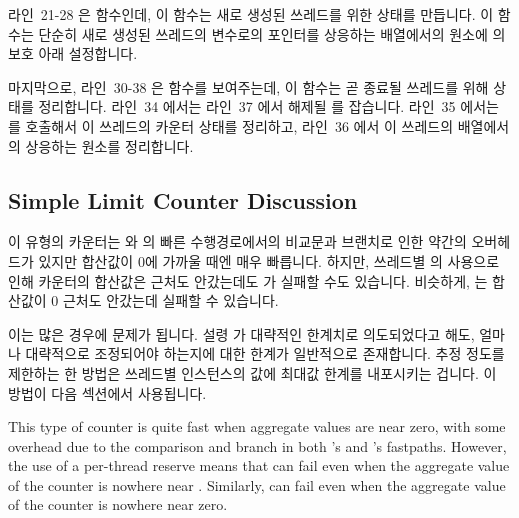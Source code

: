 라인~21-28 은  함수인데, 이 함수는 새로 생성된
쓰레드를 위한 상태를 만듭니다.
이 함수는 단순히 새로 생성된 쓰레드의  변수로의 포인터를 상응하는
 배열에서의 원소에  의 보호 아래 설정합니다.

마지막으로, 라인~30-38 은  함수를 보여주는데, 이
함수는 곧 종료될 쓰레드를 위해 상태를 정리합니다.
라인~34 에서는 라인~37 에서 해제될  를 잡습니다.
라인~35 에서는  를 호출해서 이 쓰레드의 카운터 상태를
정리하고, 라인~36 에서 이 쓰레드의  배열에서의 상응하는 원소를
정리합니다.

\subsection{Simple Limit Counter Discussion}
\label{sec:count:Simple Limit Counter Discussion}

이 유형의 카운터는  와  의 빠른 수행경로에서의
비교문과 브랜치로 인한 약간의 오버헤드가 있지만 합산값이 0에 가까울 때엔 매우
빠릅니다.
하지만, 쓰레드별  의 사용으로 인해 카운터의 합산값은
 근처도 안갔는데도  가 실패할 수도 있습니다.
비슷하게,  는 합산값이 0 근처도 안갔는데 실패할 수 있습니다.

이는 많은 경우에 문제가 됩니다.
설령  가 대략적인 한계치로 의도되었다고 해도, 얼마나
대략적으로 조정되어야 하는지에 대한 한계가 일반적으로 존재합니다.
추정 정도를 제한하는 한 방법은 쓰레드별  인스턴스의 값에 최대값
한계를 내포시키는 겁니다.
이 방법이 다음 섹션에서 사용됩니다.
\iffalse

This type of counter is quite fast when aggregate values are near zero,
with some overhead due to the comparison and branch in both
's and 's fastpaths.
However, the use of a per-thread  reserve means that
 can fail even when
the aggregate value of the counter is nowhere near .
Similarly,  can fail
even when the aggregate value of the counter is nowhere near zero.

